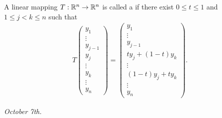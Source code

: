 \begin{definition}
    A linear mapping $T:\mathbb{R}^{n} \to \mathbb{R}^{n}$ is called a  if there exist $0 \leq t \leq 1$ and $1 \leq j < k \leq n$ such that
    \begin{align}
        T \begin{pmatrix}
            y_{1} \\ \vdots \\ y_{j-1} \\ y_{j} \\ \vdots \\ y_{k} \\ \vdots \\ y_{n}
        \end{pmatrix} = \begin{pmatrix}
            y_{1} \\ \vdots \\ y_{j-1} \\ ty_{j}+(1-t)y_{k} \\ \vdots \\ (1-t)y_{j}+ty_{k} \\ \vdots \\ y_{n}
        \end{pmatrix}.
    \end{align}
\end{definition}

\textit{October 7th.}

